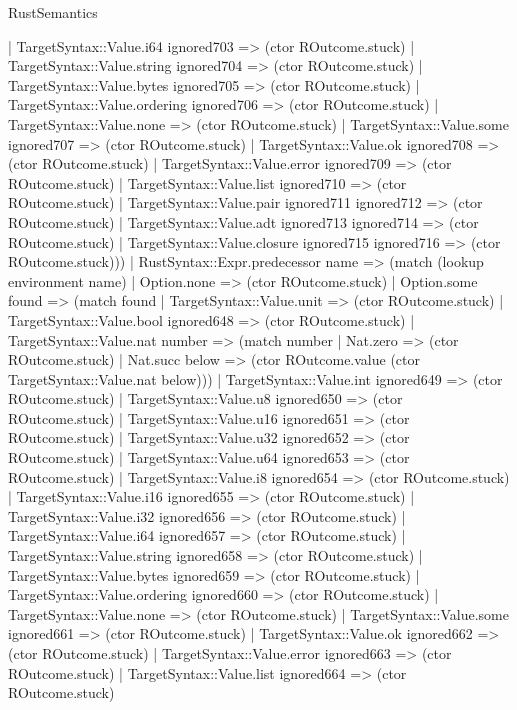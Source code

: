 \begin{lexlean}{RustSemantics}
\begin{semanticmodule}
{          | TargetSyntax::Value.i64 ignored703 => (ctor ROutcome.stuck)
          | TargetSyntax::Value.string ignored704 => (ctor ROutcome.stuck)
          | TargetSyntax::Value.bytes ignored705 => (ctor ROutcome.stuck)
          | TargetSyntax::Value.ordering ignored706 => (ctor ROutcome.stuck)
          | TargetSyntax::Value.none => (ctor ROutcome.stuck)
          | TargetSyntax::Value.some ignored707 => (ctor ROutcome.stuck)
          | TargetSyntax::Value.ok ignored708 => (ctor ROutcome.stuck)
          | TargetSyntax::Value.error ignored709 => (ctor ROutcome.stuck)
          | TargetSyntax::Value.list ignored710 => (ctor ROutcome.stuck)
          | TargetSyntax::Value.pair ignored711 ignored712 => (ctor ROutcome.stuck)
          | TargetSyntax::Value.adt ignored713 ignored714 => (ctor ROutcome.stuck)
          | TargetSyntax::Value.closure ignored715 ignored716 => (ctor ROutcome.stuck)))
      | RustSyntax::Expr.predecessor name => (match (lookup environment name)
        | Option.none => (ctor ROutcome.stuck)
        | Option.some found => (match found
          | TargetSyntax::Value.unit => (ctor ROutcome.stuck)
          | TargetSyntax::Value.bool ignored648 => (ctor ROutcome.stuck)
          | TargetSyntax::Value.nat number => (match number
            | Nat.zero => (ctor ROutcome.stuck)
            | Nat.succ below => (ctor ROutcome.value (ctor TargetSyntax::Value.nat below)))
          | TargetSyntax::Value.int ignored649 => (ctor ROutcome.stuck)
          | TargetSyntax::Value.u8 ignored650 => (ctor ROutcome.stuck)
          | TargetSyntax::Value.u16 ignored651 => (ctor ROutcome.stuck)
          | TargetSyntax::Value.u32 ignored652 => (ctor ROutcome.stuck)
          | TargetSyntax::Value.u64 ignored653 => (ctor ROutcome.stuck)
          | TargetSyntax::Value.i8 ignored654 => (ctor ROutcome.stuck)
          | TargetSyntax::Value.i16 ignored655 => (ctor ROutcome.stuck)
          | TargetSyntax::Value.i32 ignored656 => (ctor ROutcome.stuck)
          | TargetSyntax::Value.i64 ignored657 => (ctor ROutcome.stuck)
          | TargetSyntax::Value.string ignored658 => (ctor ROutcome.stuck)
          | TargetSyntax::Value.bytes ignored659 => (ctor ROutcome.stuck)
          | TargetSyntax::Value.ordering ignored660 => (ctor ROutcome.stuck)
          | TargetSyntax::Value.none => (ctor ROutcome.stuck)
          | TargetSyntax::Value.some ignored661 => (ctor ROutcome.stuck)
          | TargetSyntax::Value.ok ignored662 => (ctor ROutcome.stuck)
          | TargetSyntax::Value.error ignored663 => (ctor ROutcome.stuck)
          | TargetSyntax::Value.list ignored664 => (ctor ROutcome.stuck)
}
\end{semanticmodule}
\end{lexlean}
